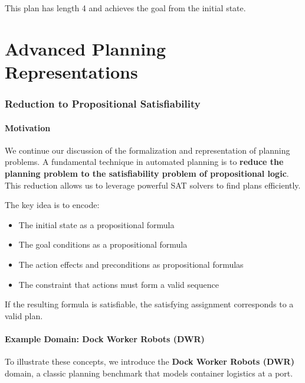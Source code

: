 \documentclass[11pt,a4paper]{article}
\theoremstyle{definition}
\theoremstyle{plain}
\theoremstyle{remark}
\begin{document}
This plan has length 4 and achieves the goal from the initial state.


\newpage

\part{Advanced Planning Representations}

\section{Reduction to Propositional Satisfiability}

\subsection{Motivation}

We continue our discussion of the formalization and representation of planning problems. A fundamental technique in automated planning is to \textbf{reduce the planning problem to the satisfiability problem of propositional logic}. This reduction allows us to leverage powerful SAT solvers to find plans efficiently.

\begin{tcolorbox}[colback=teal!10!white,colframe=teal!75!black,title=\textbf{Reduction to SAT}]
The key idea is to encode:
\begin{itemize}
    \item The initial state as a propositional formula
    \item The goal conditions as a propositional formula
    \item The action effects and preconditions as propositional formulas
    \item The constraint that actions must form a valid sequence
\end{itemize}

If the resulting formula is satisfiable, the satisfying assignment corresponds to a valid plan.
\end{tcolorbox}

\subsection{Example Domain: Dock Worker Robots (DWR)}

To illustrate these concepts, we introduce the \textbf{Dock Worker Robots (DWR)} domain, a classic planning benchmark that models container logistics at a port.
\end{document}
